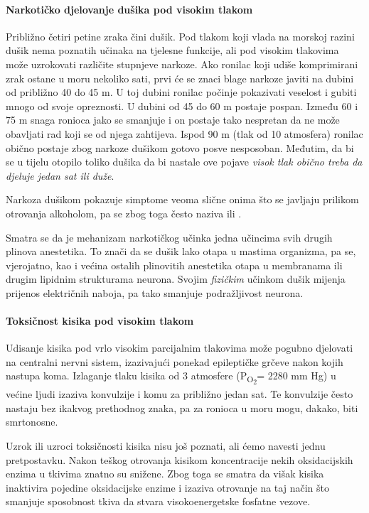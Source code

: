 \documentclass[12pt]{article}
\newcommand{\sub}[1]{\textsubscript{#1}}
\newcommand{\paro}{P\sub{O\sub{2}}}
\newcommand{\tl}{mm Hg}
\begin{document}
\paragraph{Narkotičko djelovanje dušika pod visokim tlakom} Približno četiri
petine zraka čini dušik. Pod tlakom koji vlada na morskoj razini dušik nema
poznatih učinaka na tjelesne funkcije, ali pod visokim tlakovima može uzrokovati
različite stupnjeve narkoze. Ako ronilac koji udiše komprimirani zrak ostane u
moru nekoliko sati, prvi će se znaci blage narkoze javiti na dubini od približno
40 do 45 m. U toj dubini ronilac počinje pokazivati veselost i gubiti mnogo od
svoje opreznosti. U dubini od 45 do 60 m postaje pospan. Između 60 i 75 m snaga
ronioca jako se smanjuje i on postaje tako nespretan da ne može obavljati rad
koji se od njega zahtijeva. Ispod 90 m (tlak od 10 atmosfera) ronilac obično
postaje zbog narkoze dušikom gotovo posve nesposoban. Međutim, da bi se u tijelu
otopilo toliko dušika da bi nastale ove pojave \emph{visok tlak obično treba da
    djeluje jedan sat ili duže}.

Narkoza dušikom pokazuje simptome veoma slične onima što se javljaju prilikom
otrovanja alkoholom, pa se zbog toga često naziva  ili
.

Smatra se da je mehanizam narkotičkog učinka jedna učincima svih drugih plinova
anestetika. To znači da se dušik lako otapa u mastima organizma, pa se,
vjerojatno, kao i većina ostalih plinovitih anestetika otapa u membranama ili
drugim lipidnim strukturama neurona. Svojim \emph{fizičkim} učinkom dušik
mijenja prijenos električnih naboja, pa tako smanjuje podražljivost neurona.

\paragraph{Toksičnost kisika pod visokim tlakom} Udisanje kisika pod vrlo
visokim parcijalnim tlakovima može pogubno djelovati na centralni nervni sistem,
izazivajući ponekad epileptičke grčeve nakon kojih nastupa koma. Izlaganje tlaku
kisika od 3 atmosfere (\paro = 2280 \tl{}) u većine ljudi izaziva konvulzije i
komu za približno jedan sat. Te konvulzije često nastaju bez ikakvog prethodnog
znaka, pa za ronioca u moru mogu, dakako, biti smrtonosne.

Uzrok ili uzroci toksičnosti kisika nisu još poznati, ali ćemo navesti jednu
pretpostavku. Nakon teškog otrovanja kisikom koncentracije nekih oksidacijskih
enzima u tkivima znatno su snižene. Zbog toga se smatra da višak kisika
inaktivira pojedine oksidacijske enzime i izaziva otrovanje na taj način što
smanjuje sposobnost tkiva da stvara visokoenergetske fosfatne vezove.
\end{document}
